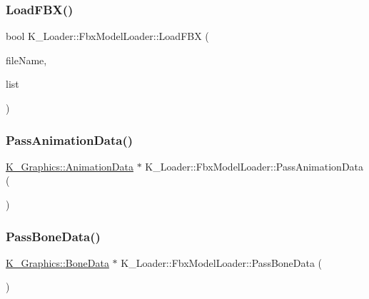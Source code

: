 \subsubsection{\texorpdfstring{Load\+F\+B\+X()}{LoadFBX()}}
{\footnotesize\ttfamily bool K\+\_\+\+Loader\+::\+Fbx\+Model\+Loader\+::\+Load\+F\+BX (\begin{DoxyParamCaption}\item[{const std\+::string \&}]{file\+Name,  }\item[{\mbox{\hyperlink{class_k___graphics_1_1_texture_list}{K\+\_\+\+Graphics\+::\+Texture\+List}} $\ast$}]{list }\end{DoxyParamCaption})}

\mbox{\label{class_k___loader_1_1_fbx_model_loader_a71eebd03b1333facbfef984a4c4d5d09}} 
\subsubsection{\texorpdfstring{Pass\+Animation\+Data()}{PassAnimationData()}}
{\footnotesize\ttfamily \mbox{\hyperlink{class_k___graphics_1_1_animation_data}{K\+\_\+\+Graphics\+::\+Animation\+Data}} $\ast$ K\+\_\+\+Loader\+::\+Fbx\+Model\+Loader\+::\+Pass\+Animation\+Data (\begin{DoxyParamCaption}{ }\end{DoxyParamCaption})}

\mbox{\label{class_k___loader_1_1_fbx_model_loader_a008c36345eebef97d18a49b57c49f646}} 
\subsubsection{\texorpdfstring{Pass\+Bone\+Data()}{PassBoneData()}}
{\footnotesize\ttfamily \mbox{\hyperlink{class_k___graphics_1_1_bone_data}{K\+\_\+\+Graphics\+::\+Bone\+Data}} $\ast$ K\+\_\+\+Loader\+::\+Fbx\+Model\+Loader\+::\+Pass\+Bone\+Data (\begin{DoxyParamCaption}{ }\end{DoxyParamCaption})}


